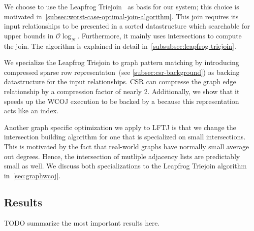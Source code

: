 We choose to use the Leapfrog Triejoin~\cite{lftj} as basis for our system;
this choice is motivated in~\cref{subsec:worst-case-optimal-join-algorithm}.
This join requires its input relationships to be presented in a sorted datastructure which searchable for upper bounds in
$\mathcal{O} \log_N$.
Furthermore, it mainly uses intersections to compute the join.
The algorithm is explained in detail in~\cref{subsubsec:leapfrog-triejoin}.

We specialize the Leapfrog Triejoin to graph pattern matching by introducing compressed sparse row representaton~(see
\cref{subsec:csr-background}) as backing datastructure for the input relationships.
\textsc{CSR} can compresse the graph edge relationship by a compression factor of nearly 2.
Additionally, we show that it speeds up the \textsc{WCOJ} execution to be backed by a  because this representation
acts like an index.

Another graph specific optimization we apply to \textsc{LFTJ} is that we change the intersection building algorithm for one
that is specialized on small intersections.
This is motivated by the fact that real-world graphs have normally small average out degrees.
Hence, the intersection of mutliple adjacency lists are predictably small as well.
We discuss both specializations to the Leapfrog Triejoin algorithm in~\cref{sec:graphwcoj}.

\subsection{Results} \label{subsec:introduction-results}
TODO summarize the most important results here.




